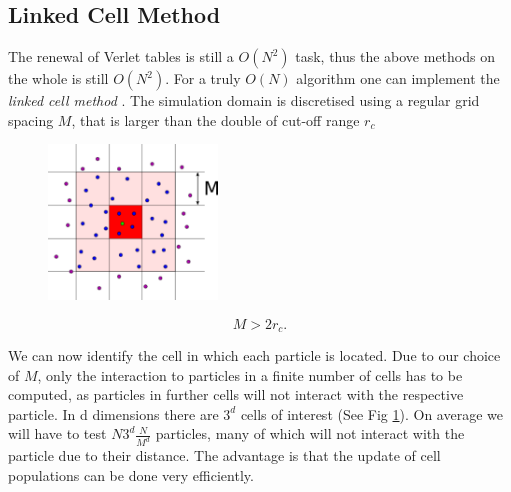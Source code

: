 
\subsection{Linked Cell Method}

The renewal of Verlet tables is still a $O(N^2)$ task, thus the above methods on the whole is still $O(N^2)$. For a truly $O(N)$ algorithm one can implement the \emph{linked cell method} \citep{art}. The simulation domain is discretised using a regular grid spacing $M$, that is larger than the double of cut-off range $r_c$


\begin{figure}
  \vspace{-30pt}
  \centering
  \includegraphics[width=0.4\textwidth]{pics/linked_cells_block}
  \label{fig:linked_cells}
  \vspace{-30pt}
\end{figure}


\[
M > 2r_c.
\] 

%
\noindent We can now identify the cell in which each particle is located. Due to our choice of $M$, only the interaction to particles in a finite number of cells has to be computed, as particles in further cells will not interact with the respective particle. In d dimensions  there are $3^d$ cells of interest (See Fig \ref{fig:linked_cells}). On average we will have to test $N3^d \frac{N}{M^d}$ particles, many of which will not interact with the particle due to their distance. The advantage is that the update of cell populations can be done very efficiently. 


